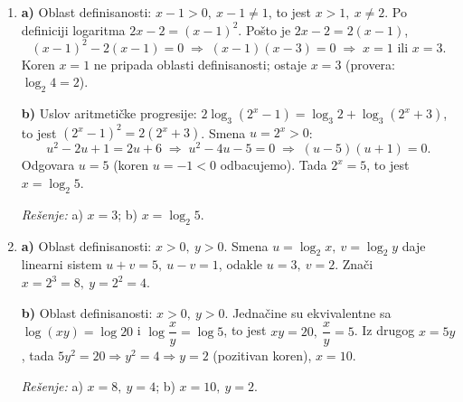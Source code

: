 \begin{enumerate}[label=\arabic*.]
\textit{Rešenje:} a) $\dfrac{1+a+2b}{2+a}$; \quad b) $\dfrac{1+a-2b}{b}$.

\item
\textbf{a)} Oblast definisanosti: $x-1>0,\ x-1\ne1$, to jest $x>1,\ x\ne2$. Po definiciji logaritma $2x-2=(x-1)^{2}$. Pošto je $2x-2=2(x-1)$,
\[
(x-1)^{2}-2(x-1)=0 \;\Rightarrow\; (x-1)(x-3)=0 \;\Rightarrow\; x=1 \text{ ili } x=3.
\]
Koren $x=1$ ne pripada oblasti definisanosti; ostaje $x=3$ (provera: $\log_{2}4=2$).

\textbf{b)} Uslov aritmetičke progresije: $2\log_{3}\left(2^{x}-1\right)=\log_{3}2+\log_{3}\left(2^{x}+3\right)$, to jest $\left(2^{x}-1\right)^{2}=2\left(2^{x}+3\right)$. Smena $u=2^{x}>0$:
\[
u^{2}-2u+1=2u+6 \;\Rightarrow\; u^{2}-4u-5=0 \;\Rightarrow\; (u-5)(u+1)=0.
\]
Odgovara $u=5$ (koren $u=-1<0$ odbacujemo). Tada $2^{x}=5$, to jest $x=\log_{2}5$.

\textit{Rešenje:} a) $x=3$; \quad b) $x=\log_{2}5$.

\item
\textbf{a)} Oblast definisanosti: $x>0,\ y>0$. Smena $u=\log_{2}x,\ v=\log_{2}y$ daje linearni sistem $u+v=5,\ u-v=1$, odakle $u=3,\ v=2$. Znači $x=2^{3}=8,\ y=2^{2}=4$.

\textbf{b)} Oblast definisanosti: $x>0,\ y>0$. Jednačine su ekvivalentne sa $\log(xy)=\log20$ i $\log\dfrac{x}{y}=\log5$, to jest $xy=20,\ \dfrac{x}{y}=5$. Iz drugog $x=5y$, tada $5y^{2}=20 \Rightarrow y^{2}=4 \Rightarrow y=2$ (pozitivan koren), $x=10$.

\textit{Rešenje:} a) $x=8,\ y=4$; \quad b) $x=10,\ y=2$.
\end{enumerate}
\clearpage
